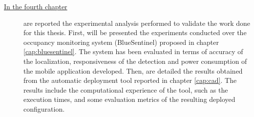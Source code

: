 \begin{description}
%
\item[{\hyperref[cap:results]{In the fourth chapter}}] are reported the experimental analysis performed to validate the work done for this thesis. First, will be presented the experiments conducted over the occupancy monitoring system (BlueSentinel) proposed in chapter \ref{cap:bluesentinel}. The system has been evaluated in terms of accuracy of the localization, responsiveness of the detection and power consumption of the mobile application developed.
Then, are detailed the results obtained from the automatic deployment tool reported in chapter \ref{cap:cad}. The results include the computational experience of the tool, such as the execution times, and some evaluation metrics of the resulting deployed configuration.
%
\end{description}
%
